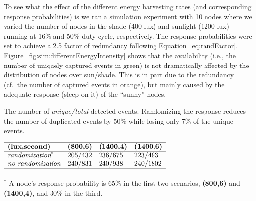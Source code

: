 To see what the effect of the different energy harvesting rates
(and corresponding response probabilities) is we ran a simulation
experiment with 10 nodes where we varied the number of nodes in the
shade (400 lux) and sunlight (1200 lux) running at 16\% and 50\% duty
cycle, respectively. The response probabilities were set to achieve
a 2.5 factor of redundancy following Equation~\ref{eq:randFactor}.
Figure~\ref{fig:sim:differentEnergyIntensity} shows that the \cis
availability (i.e., the number of uniquely captured events in green) is
not dramatically affected by the distribution of nodes over sun/shade.
This is in part due to the redundancy (cf.\ the number of captured events
in orange), but mainly caused by the adequate response (sleep on it)
of the ``sunny'' nodes.



\begin{table}
	\centering
    \caption{The number of \textit{unique/total} detected events.
    Randomizing the response reduces the number of duplicated events by 50\% while losing only 7\% of the unique events.}
    \label{tab:regular_rand}
    $
    \begin{array}{llll}\hline
     \textbf{(lux,second)} & \textbf{(800,6)} & \textbf{(1400,4)} & \textbf{(1400,6)}\\\hline
    \textit{randomization}^{*}    & 205/432 &  236/675 & 223/493 \\
    \textit{no randomization} & 240/831 &  240/938 & 240/1802 \\\hline
    \vspace{-2ex} \\
    \end{array}
    $
    \parbox{0.8\linewidth}{
    $^{*}$ A node's response probability is 65\% in the first two scenarios,
    \textbf{(800,6)} and \textbf{(1400,4)}, and 30\% in the third.}
\end{table}

